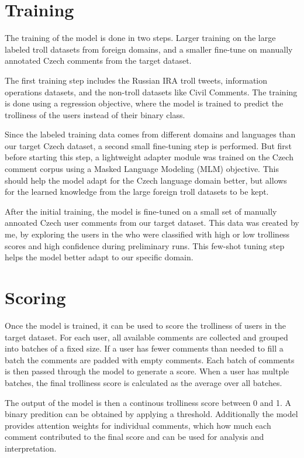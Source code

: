 \documentclass[twoside]{ctuthesis}
\theoremstyle{plain}
\theoremstyle{definition}
\theoremstyle{note}
\begin{document}
\section{Training}
The training of the model is done in two steps. Larger training on the large labeled troll datasets from foreign domains, and a smaller fine-tune on manually annotated Czech comments from the target dataset.\par
The first training step includes the Russian IRA troll tweets, information operations datasets, and the non-troll datasets like Civil Comments. The training is done using a regression objective, where the model is trained to predict the trolliness of the users instead of their binary class.\par
Since the labeled training data comes from different domains and languages than our target Czech dataset, a second small fine-tuning step is performed. But first before starting this step, a lightweight adapter module was trained on the Czech comment corpus using a Masked Language Modeling (MLM) objective. This should help the model adapt for the Czech language domain better, but allows for the learned knowledge from the large foreign troll datasets to be kept.\par
After the initial training, the model is fine-tuned on a small set of manually annoated Czech user comments from our target dataset. This data was created by me, by exploring the users in the who were classified with high or low trolliness scores and high confidence during preliminary runs. This few-shot tuning step helps the model better adapt to our specific domain.\par


\section{Scoring}
Once the model is trained, it can be used to score the trolliness of users in the target dataset. For each user, all available comments are collected and grouped into batches of a fixed size. If a user has fewer comments than needed to fill a batch the comments are padded with empty comments. Each batch of comments is then passed through the model to generate a score. When a user has multple batches, the final trolliness score is calculated as the average over all batches.\par
The output of the model is then a continous trolliness score between 0 and 1. A binary predition can be obtained by applying a threshold. Additionally the model provides attention weights for individual comments, which how much each comment contributed to the final score and can be used for analysis and interpretation.\par
\end{document}
